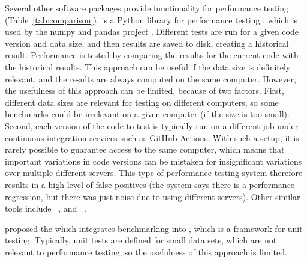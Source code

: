 Several other software packages provide functionality for performance testing (Table~\ref{tab:comparison}).
 is a Python library for performance testing \citep{airspeed_velocity}, which is used by the numpy and pandas project \citep{numpy,pandas}. 
Different tests are run for a given code version and data size, and then results are saved to disk, creating a historical result.
Performance is tested by comparing the results for the current code with the historical results.
This approach can be useful if the data size is definitely relevant, and the results are always computed on the same computer.
However, the usefulness of this approach can be limited, because of two factors. 
First, different data sizes are relevant for testing on different computers, so some benchmarks could be irrelevant on a given computer (if the size is too small). 
Second, each version of the code to test is typically run on a different job under continuous integration services such as GitHub Actions. 
With such a setup, it is rarely possible to guarantee access to the same computer, which means that important variations in code versions can be mistaken for insignificant variations over multiple different servers.
This type of performance testing system therefore results in a high level of false positives (the system says there is a performance regression, but there was just noise due to using different servers).
Other similar tools include
~\citep{conbench}, 
and ~\citep{bencher}.

\citet{pytest_benchmark} proposed the  which integrates  benchmarking into , which is a framework for unit testing.
Typically, unit tests are defined for small data sets, which are not relevant to performance testing, so the usefulness of this approach is limited.

